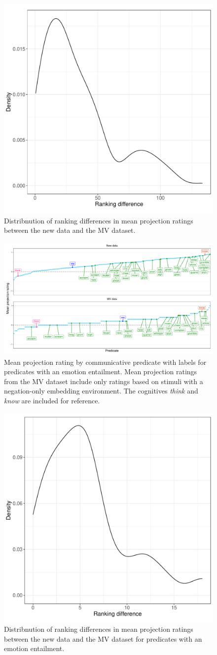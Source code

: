 \documentclass[11pt,fleqn]{article}
\newcommand{\6}{\mbox{$[\hspace*{-.6mm}[$}}
\newcommand{\9}{\mbox{$]\hspace*{-.6mm}]$}}
\begin{document}
\begin{figure}[H]
	\centering
	\includegraphics[width=.35\textwidth]{ranking-difference}
	\caption{Distribnution of ranking differences in mean projection ratings between the new data and the MV dataset.}
	\label{rankdiff}
\end{figure}


\begin{figure}[H]
	\centering
	\includegraphics[width=1\textwidth]{projection-by-communicative-emo-labels-comparison}
	\caption{Mean projection rating by communicative predicate with labels for predicates with an emotion entailment. Mean projection ratings from the MV dataset include only ratings based on stimuli with a negation-only embedding environment. The cognitives \emph{think} and \emph{know} are included for reference.}
	\label{projlabemo}
\end{figure}

\begin{figure}[H]
	\centering
	\includegraphics[width=.35\textwidth]{ranking-difference-emo}
	\caption{Distribnution of ranking differences in mean projection ratings between the new data and the MV dataset for predicates with an emotion entailment.}
	\label{rankdiffemo}
\end{figure}
\end{document}
